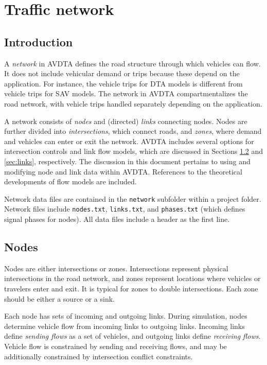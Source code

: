 \chapter{Traffic network}
\label{ch:network}


\section{Introduction}
A \textit{network} in AVDTA defines the road structure through which vehicles can flow. It does not include vehicular demand or trips because these depend on the application. For instance, the vehicle trips for DTA models is different from vehicle trips for SAV models. The network in AVDTA compartmentalizes the road network, with vehicle trips handled separately depending on the application.

A network consists of \textit{nodes} and (directed) \textit{links} connecting nodes. Nodes are further divided into \textit{intersections}, which connect roads, and \textit{zones}, where demand and vehicles can enter or exit the network. AVDTA includes several options for intersection controls and link flow models, which are discussed in Sections \ref{sec:nodes} and \ref{sec:links}, respectively. The discussion in this document pertains to using and modifying node and link data within AVDTA. References to the theoretical developments of flow models are included.

Network data files are contained in the \texttt{network} subfolder within a project folder. Network files include \texttt{nodes.txt}, \texttt{links.txt}, and \texttt{phases.txt} (which defines signal phases for nodes). All data files include a header as the first line. 

\section{Nodes}
\label{sec:nodes}

Nodes are either intersections or zones. Intersections represent physical intersections in the road network, and zones represent locations where vehicles or travelers enter and exit. It is typical for zones to double intersections. Each zone should be either a source or a sink.

Each node has sets of incoming and outgoing links. During simulation, nodes determine vehicle flow from incoming links to outgoing links. Incoming links define \textit{sending flows} as a set of vehicles, and outgoing links define \textit{receiving flows}. Vehicle flow is constrained by sending and receiving flows, and may be additionally constrained by intersection conflict constraints. 

